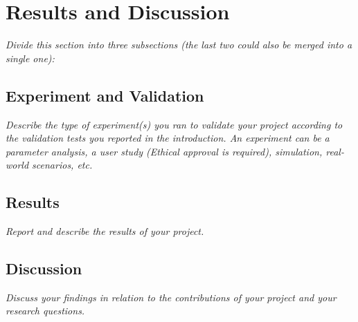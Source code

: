 \section{Results and Discussion}

\textit{Divide this section into three subsections (the last two could also be merged into a single one):}

\subsection{Experiment and Validation}

\textit{Describe the type of experiment(s) you ran to validate your project according to the validation tests you reported in the introduction. An experiment can be a parameter analysis, a user study (Ethical approval is required), simulation, real-world scenarios, etc.}

\subsection{Results}

\textit{Report and describe the results of your project.}

\subsection{Discussion}
\textit{Discuss your findings in relation to the contributions of your project and your research questions.}


